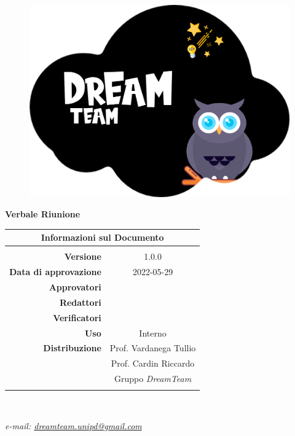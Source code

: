 \begin{center}

	\begin{figure}
		\centering
		\includegraphics[scale=0.05]{Sezioni/images/DreamTeam.png}
	\end{figure}

	{\Huge{\textbf{Verbale Riunione \D}}} \\ [1cm]

	\begin{table}[htbp]
		\centering
		\begin{tabular}{r|c}
			\multicolumn{2}{c}{\textbf{Informazioni sul Documento}}   \\
			\hline                                                    \\
			\textbf{Versione}             & 1.0.0                     \\ \rule{0pt}{3ex}
			\textbf{Data di approvazione} &        2022-05-29             \\ \rule{0pt}{3ex}
			\textbf{Approvatori}          & \MG                          \\ \rule{0pt}{3ex}
			\textbf{Redattori}            & \PV                       \\ \rule{0pt}{3ex}
			\textbf{Verificatori}         &   \GC                      \\ \rule{0pt}{3ex}
			\textbf{Uso}                  & Interno                   \\ \rule{0pt}{3ex}
			\textbf{Distribuzione}        & Prof. Vardanega Tullio    \\ \rule{0pt}{2ex}
			                              & Prof. Cardin Riccardo     \\ \rule{0pt}{2ex}
			                              & Gruppo \textit{DreamTeam} \\ \rule{0pt}{0.1cm}
		\end{tabular} \\ [0.5cm]
	\end{table}

	\textsl{ e-mail: \href{mailto:dreamteam.unipd@gmail.com}{dreamteam.unipd@gmail.com} } \\[2cm]
\end{center}
\pagebreak